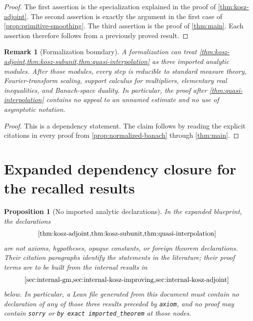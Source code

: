 \documentclass[11pt]{article}
\newtheorem{proposition}[theorem]{Proposition}
\newtheorem{remark}[theorem]{Remark}
\begin{document}
	\begin{proof}
		The first assertion is the specialization explained in the proof of \cref{thm:kosz-adjoint}.  The second assertion is exactly the argument in the first case of \cref{prop:primitive-smoothing}.  The third assertion is the proof of \cref{thm:main}.  Each assertion therefore follows from a previously proved result.
	\end{proof}
	
	\begin{remark}[Formalization boundary]\label{rem:formalization-boundary}
		A formalization can treat \cref{thm:kosz-adjoint,thm:kosz-subunit,thm:quasi-interpolation} as three imported analytic modules.  After those modules, every step is reducible to standard measure theory, Fourier-transform scaling, support calculus for multipliers, elementary real inequalities, and Banach-space duality.  In particular, the proof after \cref{thm:quasi-interpolation} contains no appeal to an unnamed estimate and no use of asymptotic notation.
	\end{remark}
	
	\begin{proof}
		This is a dependency statement.  The claim follows by reading the explicit citations in every proof from \cref{prop:normalized-banach} through \cref{thm:main}.
	\end{proof}
	
	\section{Expanded dependency closure for the recalled results}\label{sec:expanded-closure}
	
	\begin{proposition}[No imported analytic declarations]\label{prop:no-imported-analytic-declarations}
		In the expanded blueprint, the declarations
		\[
		\cref{thm:kosz-adjoint,thm:kosz-subunit,thm:quasi-interpolation}
		\]
		are not axioms, hypotheses, opaque constants, or foreign theorem declarations.  Their citation paragraphs identify the statements in the literature; their proof terms are to be built from the internal results in
		\[
		\cref{sec:internal-gm,sec:internal-kosz-improving,sec:internal-kosz-adjoint}
		\]
		below.  In particular, a Lean file generated from this document must contain no declaration of any of those three results preceded by \texttt{axiom}, and no proof may contain \texttt{sorry} or \texttt{by exact imported\_theorem} at those nodes.
	\end{proposition}
	
\end{document}
